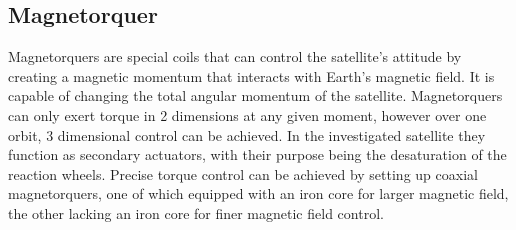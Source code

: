 \subsection{Magnetorquer}

Magnetorquers are special coils that can control the satellite's attitude by creating a magnetic momentum that interacts with Earth's magnetic field. It is capable of changing the total angular momentum of the satellite. Magnetorquers can only exert torque in 2 dimensions at any given moment, however over one orbit, 3 dimensional control can be achieved. In the investigated satellite they function as secondary actuators, with their purpose being the desaturation of the reaction wheels. Precise torque control can be achieved by setting up coaxial magnetorquers, one of which equipped with an iron core for larger magnetic field, the other lacking an iron core for finer magnetic field control.